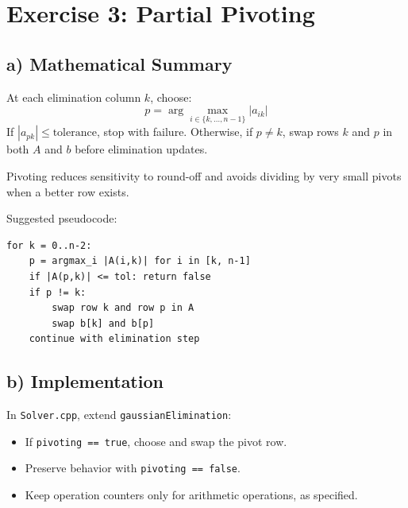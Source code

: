 \documentclass[11pt,a4paper]{article}
\begin{document}
\section*{Exercise 3: Partial Pivoting}

\subsection*{a) Mathematical Summary}
At each elimination column $k$, choose:
$$
p = \arg\max_{i\in\{k,\dots,n-1\}} |a_{ik}|
$$
If $|a_{pk}| \leq \text{tolerance}$, stop with failure. Otherwise, if $p\neq k$,
swap rows $k$ and $p$ in both $A$ and $b$ before elimination updates.

Pivoting reduces sensitivity to round-off and avoids dividing by very small pivots
when a better row exists.

Suggested pseudocode:
\begin{verbatim}
for k = 0..n-2:
    p = argmax_i |A(i,k)| for i in [k, n-1]
    if |A(p,k)| <= tol: return false
    if p != k:
        swap row k and row p in A
        swap b[k] and b[p]
    continue with elimination step
\end{verbatim}

\subsection*{b) Implementation}
In \texttt{Solver.cpp}, extend \texttt{gaussianElimination}:
\begin{itemize}[leftmargin=*]
    \item If \texttt{pivoting == true}, choose and swap the pivot row.
    \item Preserve behavior with \texttt{pivoting == false}.
    \item Keep operation counters only for arithmetic operations, as specified.
\end{itemize}
\par
\end{document}
